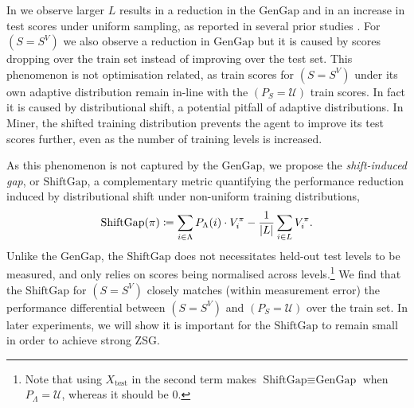 In  we observe larger $L$ results in a reduction in the $\text{GenGap}$ and in an increase in test scores under uniform sampling, as reported in several prior studies \citep{OverfittingDRL,procgen,Packer2018AssessingGI}. For $(S=S^V)$ we also observe a reduction in $\text{GenGap}$ but it is caused by scores dropping over the train set instead of improving over the test set. This phenomenon is not optimisation related, as train scores for $(S=S^V)$ under its own adaptive distribution remain in-line with the $(P_S=\mathcal{U})$ train scores. In fact it is caused by distributional shift, a potential pitfall of adaptive distributions. In Miner, the shifted training distribution prevents the agent to improve its test scores further, even as the number of training levels is increased. 

As this phenomenon is not captured by the $\text{GenGap}$, %
we propose the \textit{shift-induced gap}, or $\text{ShiftGap}$, a complementary metric quantifying the performance reduction induced by distributional shift under non-uniform training distributions,
\begin{equation} \label{c3:eq:ShiftGap}
    \text{ShiftGap}(\pi) \coloneqq \sum_{i \in \Lambda} P_\Lambda(i) \cdot V^\pi_{i} - \frac{1}{|L|} \sum_{i \in L} V^\pi_{i}.
\end{equation}
Unlike the $\text{GenGap}$, the $\text{ShiftGap}$ does not necessitates held-out test levels to be measured, and only relies on scores being normalised across levels.\footnote{Note that using $X_\text{test}$ in the second term makes $\text{ShiftGap}\equiv\text{GenGap}$ when $P_\Lambda = \mathcal{U}$, whereas it should be 0.} We find that the $\text{ShiftGap}$ for $(S=S^V)$ closely matches (within measurement error) the performance differential between $(S=S^V)$ and $(P_S=\mathcal{U})$ over the train set. In later experiments, we will show it is important for the $\text{ShiftGap}$ to remain small in order to achieve strong ZSG.
%

